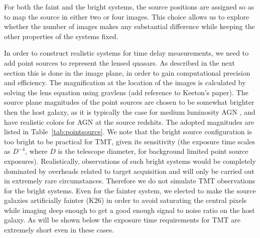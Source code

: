\documentclass[a4paper,11pt]{article}
\begin{document}
For both the faint and the bright systems, the source positions are
assigned so as to map the source in either two or four images. This
choice allows us to explore whether the number of images makes any
substantial difference while keeping the other properties of the
systems fixed.

In order to construct realistic systems for time delay measurements,
we need to add point sources to represent the lensed quasars. As
described in the next section this is done in the image plane, in
order to gain computational precision and efficiency. The
magnification at the location of the images is calculated by solving
the lens equation using gravlens (add reference to Keeton's
paper). The source plane magnitudes of the point sources are chosen to
be somewhat brighter then the host galaxy, as it is typically the case
for medium luminosity AGN \citep[e.g.,][]{Bennert++11}, and have
realistic colors for AGN at the source redshits. The adopted
magnitudes are listed in Table~\ref{tab:pointsource}.  We note that
the bright source configuration is too bright to be practical for TMT,
given its sensitivity (the exposure time scales as $D^{-4}$, where $D$
is the telescope diameter, for background limited point source
exposures). Realistically, observations of such bright systems would
be completely dominated by overheads related to target acquisition and
will only be carried out in extremely rare circumstances. Therefore we
do not simulate TMT observations for the bright systems. Even for the
fainter system, we elected to make the source galaxies artificially
fainter (K26) in order to avoid saturating the central pixels while
imaging deep enough to get a good enough signal to noise ratio on the
host galaxy. As will be shown below the exposure time requirements for
TMT are extremely short even in these cases.

\end{document}
